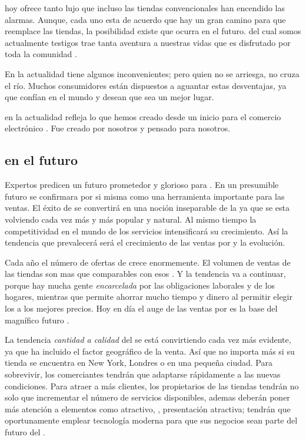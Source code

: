 \ecommerce hoy ofrece tanto lujo que incluso las tiendas convencionales han encendido las alarmas. Aunque, cada uno esta de acuerdo que hay un gran camino para que \ecommerce reemplace las tiendas, la posibilidad existe que ocurra en el futuro. \ecommerce del cual somos actualmente testigos trae tanta aventura a nuestras vidas que es disfrutado por toda la comunidad \online.

En la actualidad \ecommerce tiene algunos inconvenientes; pero quien no se arriesga, no cruza el río. Muchos consumidores están dispuestos a aguantar estas desventajas, ya que confían en el mundo \online y desean que sea un mejor lugar.

\ecommerce en la actualidad refleja lo que hemos creado desde un inicio para el comercio electrónico \online. Fue creado por nosotros y pensado para nosotros.

\subsection{\ecommerce en el futuro}

Expertos predicen un futuro prometedor y glorioso para \ecommerce. En un presumible futuro \ecommerce se confirmara por si misma como una herramienta importante para las ventas. El éxito de \ecommerce se convertirá en una noción inseparable de la \webINT ya que \eshopping se esta volviendo cada vez más y más popular y natural. Al mismo tiempo la competitividad en el mundo de los servicios \ecommerce intensificará su crecimiento. Así la tendencia que  prevalecerá \ecommerce será el crecimiento de las ventas por \internet y la evolución.

Cada año el número de ofertas de \ecommerce crece enormemente. El volumen de ventas de las tiendas \online  son mas que comparables con esos \brickandmortar. Y la tendencia va a continuar, porque hay mucha gente \textit{encarcelada} por las obligaciones laborales y de los hogares, mientras que \internet permite ahorrar mucho tiempo y dinero al permitir  elegir los \itemsCOM a los mejores precios. Hoy en día el auge de las ventas por \internet es la base del magnífico futuro \ecommerce.

La tendencia \textit{cantidad a calidad} del \ecommerce se está convirtiendo cada vez más evidente, ya que \internet ha incluido el factor geográfico de la venta. Así que no importa más si su tienda se encuentra en New York, Londres o en una pequeña ciudad. Para sobrevivir, los comerciantes tendrán que adaptarse rápidamente a las nuevas condiciones. Para atraer a más clientes, los propietarios de las tiendas \online tendrán no solo que incrementar el número de servicios disponibles, ademas deberán poner más atención a elementos como \design atractivo, \userfriendliness, presentación atractiva; tendrán que oportunamente emplear tecnología moderna para que sus negocios sean parte del futuro del \ecommerce.

